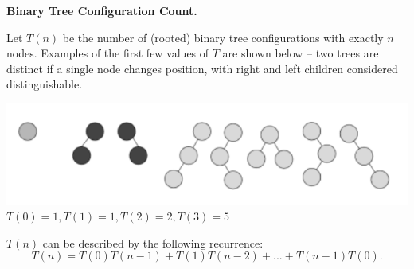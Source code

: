 \documentclass[11pt,addpoints]{exam}
\begin{document}
\begin{questions}
    \question \textbf{Binary Tree Configuration Count.}
    
    Let $T(n)$ be the number of (rooted) binary tree configurations with exactly $n$ nodes. Examples of the first few values of $T$ are shown below – two trees are distinct if a single node changes position, with right and left children considered distinguishable. 

\begin{center}
\includegraphics[scale=0.6]{MC-4.png}\\
$T(0) = 1, T(1) = 1, T(2) = 2, T(3) = 5$
\end{center}

 $T(n)$ can be described by the following recurrence:
 \[T(n) = T(0)T(n - 1) + T(1)T(n - 2) + ... + T(n - 1)T(0).\]

\begin{solution}
  \begin{parts}

\end{parts}
\end{solution}
\end{questions}
\end{document}
